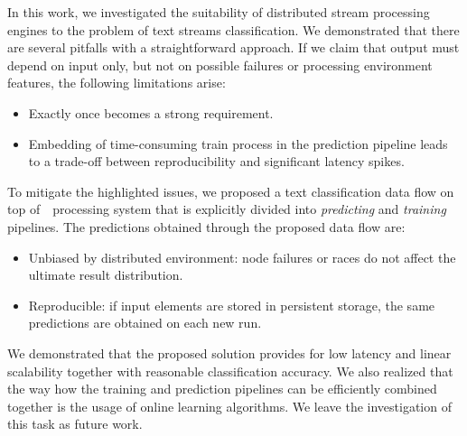 \label {fs-short-conclusion}

In this work, we investigated the suitability of distributed stream processing engines to the problem of text streams classification. We demonstrated that there are several pitfalls with a straightforward approach. If we claim that output must depend on input only, but not on possible failures or processing environment features, the following limitations arise:

\begin{itemize}
    \item Exactly once becomes a strong requirement.
    \item Embedding of time-consuming train process in the prediction pipeline leads to a trade-off between reproducibility and significant latency spikes.
\end{itemize}

To mitigate the highlighted issues, we proposed a text classification data flow on top of~\FlameStream\ processing system that is explicitly divided into {\em predicting} and {\em training} pipelines. The predictions obtained through the proposed data flow are:

\begin{itemize}
    \item Unbiased by distributed environment: node failures or races do not affect the ultimate result distribution.
    \item Reproducible: if input elements are stored in persistent storage, the same predictions are obtained on each new run.
\end{itemize}

We demonstrated that the proposed solution provides for low latency and linear scalability together with reasonable classification accuracy. We also realized that the way how the training and prediction pipelines can be efficiently combined together is the usage of online learning algorithms. We leave the investigation of this task as future work.